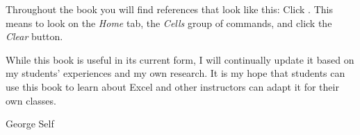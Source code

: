 Throughout the book you will find references that look like this: Click . This means to look on the \textit{Home} tab, the \textit{Cells} group of commands, and click the \textit{Clear} button.

While this book is useful in its current form, I will continually update it based on my students' experiences and my own research. It is my hope that students can use this book to learn about Excel and other instructors can adapt it for their own classes.

\bigskip
\begin{flushright}
  \textemdash \; George Self
\end{flushright}

